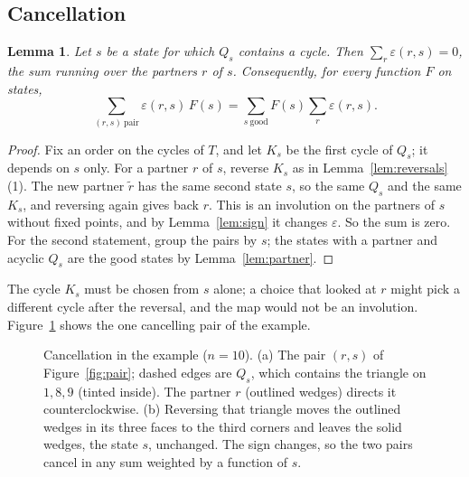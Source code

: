 \documentclass[10pt]{amsart}
\numberwithin{equation}{section}
\newtheorem{lemma}[equation]{Lemma}
\theoremstyle{definition}
\theoremstyle{remark}
\newcommand{\T}{T}
\newcommand{\eps}{\varepsilon}
\newcommand{\FIG}{figures/}
\begin{document}
\subsection*{Cancellation}

\begin{lemma}\label{lem:cancel}
Let $s$ be a state for which $Q_s$ contains a cycle.
Then $\sum_r\eps(r,s)=0$, the sum running over the partners $r$ of $s$.
Consequently, for every function $F$ on states,
\[
\sum_{(r,s)\ \text{pair}}\eps(r,s)\,F(s)=\sum_{s\ \text{good}}F(s)\sum_{r}\eps(r,s).
\]
\end{lemma}

\begin{proof}
Fix an order on the cycles of $\T$, and let $K_s$ be the first cycle of $Q_s$; it depends on $s$ only.
For a partner $r$ of $s$, reverse $K_s$ as in Lemma~\ref{lem:reversals}(1).
The new partner $\tilde r$ has the same second state $s$, so the same $Q_s$ and the same $K_s$, and reversing again gives back $r$.
This is an involution on the partners of $s$ without fixed points, and by Lemma~\ref{lem:sign} it changes $\eps$.
So the sum is zero.
For the second statement, group the pairs by $s$; the states with a partner and acyclic $Q_s$ are the good states by Lemma~\ref{lem:partner}.
\end{proof}

The cycle $K_s$ must be chosen from $s$ alone; a choice that looked at $r$ might pick a different cycle after the reversal, and the map would not be an involution.
Figure~\ref{fig:cancel} shows the one cancelling pair of the example.

\begin{figure}[t]
\centering
{}\hfill
{}
\caption{Cancellation in the example ($n=10$). (a) The pair $(r,s)$ of Figure~\ref{fig:pair}; dashed edges are $Q_s$, which contains the triangle on $1,8,9$ (tinted inside). The partner $r$ (outlined wedges) directs it counterclockwise. (b) Reversing that triangle moves the outlined wedges in its three faces to the third corners and leaves the solid wedges, the state $s$, unchanged. The sign changes, so the two pairs cancel in any sum weighted by a function of $s$.}
\label{fig:cancel}
\end{figure}
\end{document}
